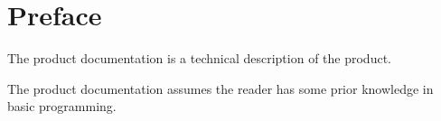 \section{Preface}

The product documentation is a technical description of the product.

The product documentation assumes the reader has some prior knowledge in basic programming.